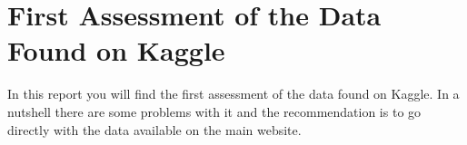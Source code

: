 \section{First Assessment of the Data Found on Kaggle}
In this report you will find the first assessment of the data found on Kaggle. In a nutshell there are some problems with it and the recommendation is to go directly with the data available on the main website.

